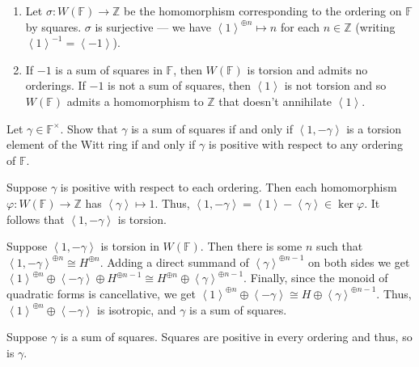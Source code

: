 \documentclass[12 pt, letterpaper]{hmcpset}
\begin{document}
\begin{solution}
\begin{enumerate}
		\item Let $\sigma : W(\mathbb{F}) \to \mathbb{Z}$ be the homomorphism corresponding to the ordering on $\mathbb{F}$ by squares. $\sigma$ is surjective --- we have $\left < 1 \right >^{\oplus n} \mapsto n$ for each $n \in \mathbb{Z}$ (writing $\left < 1 \right >^{-1} = \left < -1 \right >$). 

		\item If $-1$ is a sum of squares in $\mathbb{F}$, then $W(\mathbb{F})$ is torsion and admits no orderings. If $-1$ is not a sum of squares, then $\left < 1 \right >$ is not torsion and so $W(\mathbb{F})$ admits a homomorphism to $\mathbb{Z}$ that doesn't annihilate $\left < 1 \right >$.
	\end{enumerate}
\end{solution}

\pagebreak

\begin{problem}[(6)]
	Let $\gamma \in \mathbb{F}^{\times}$. Show that $\gamma$ is a sum of squares if and only if $\left < 1, -\gamma \right >$ is a torsion element of the Witt ring if and only if $\gamma$ is positive with respect to any ordering of $\mathbb{F}$.
\end{problem}

\begin{solution}
	Suppose $\gamma$ is positive with respect to each ordering. Then each homomorphism $\varphi : W(\mathbb{F}) \to \mathbb{Z}$ has $\left < \gamma \right > \mapsto 1$. Thus, $\left < 1, - \gamma \right > = \left < 1 \right > - \left < \gamma \right > \in \ker \varphi$. It follows that $\left < 1, -\gamma \right >$ is torsion.

	Suppose $\left < 1, - \gamma \right >$ is torsion in $W(\mathbb{F})$. Then there is some $n$ such that $\left < 1, -\gamma \right >^{\oplus n} \cong H^{\oplus n}$. Adding a direct summand of $\left < \gamma \right >^{\oplus n - 1}$ on both sides we get $\left < 1 \right >^{\oplus n} \oplus \left < -\gamma \right > \oplus H^{\oplus n - 1} \cong H^{\oplus n} \oplus \left < \gamma \right >^{\oplus n - 1}$. Finally, since the monoid of quadratic forms is cancellative, we get $\left < 1 \right >^{\oplus n} \oplus \left < - \gamma \right > \cong H \oplus \left < \gamma \right >^{\oplus n - 1}$. Thus, $\left < 1 \right >^{\oplus n} \oplus \left < -\gamma \right >$ is isotropic, and $\gamma$ is a sum of squares.

	Suppose $\gamma$ is a sum of squares. Squares are positive in every ordering and thus, so is $\gamma$.
\end{solution}
\end{document}
